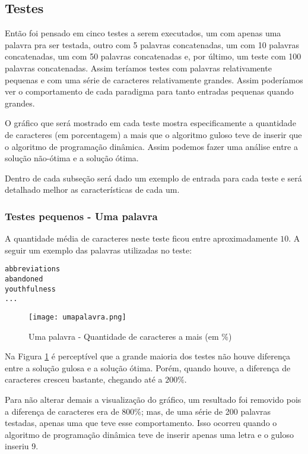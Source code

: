 \documentclass[12pt]{article}
\begin{document}
\subsection{Testes}
\label{testes}

Então foi pensado em cinco testes a serem executados, um com apenas uma palavra pra ser testada, outro com 5 palavras concatenadas, um com 10 palavras concatenadas, um com 50 palavras concatenadas e, por último, um teste com 100 palavras concatenadas. Assim teríamos testes com palavras relativamente pequenas e com uma série de caracteres relativamente grandes. Assim poderíamos ver o comportamento de cada paradigma para tanto entradas pequenas quando grandes.

O gráfico que será mostrado em cada teste mostra especificamente a quantidade de caracteres (em porcentagem) a mais que o algoritmo guloso teve de inserir que o algoritmo de programação dinâmica. Assim podemos fazer uma análise entre a solução não-ótima e a solução ótima.

Dentro de cada subseção será dado um exemplo de entrada para cada teste e será detalhado melhor as características de cada um.

\subsubsection{Testes pequenos - Uma palavra}
\label{pequeno}

A quantidade média de caracteres neste teste ficou entre aproximadamente $10$. A seguir um exemplo das palavras utilizadas no teste:

\begin{verbatim}
abbreviations
abandoned
youthfulness
...
\end{verbatim}


    \begin{figure}[h!]
        \centering
        \texttt{[image: umapalavra.png]}
        \caption{Uma palavra - Quantidade de caracteres a mais (em \%)}
        \label{umapalavra}
    \end{figure}

    Na Figura \ref{umapalavra} é perceptível que a grande maioria dos testes não houve diferença entre a solução gulosa e a solução ótima. Porém, quando houve, a diferença de caracteres cresceu bastante, chegando até a $200\%$.

    Para não alterar demais a visualização do gráfico, um resultado foi removido pois a diferença de caracteres era de $800\%$; mas, de uma série de 200 palavras testadas, apenas uma que teve esse comportamento. Isso ocorreu quando o algoritmo de programação dinâmica teve de inserir apenas uma letra e o guloso inseriu 9.
\end{document}
